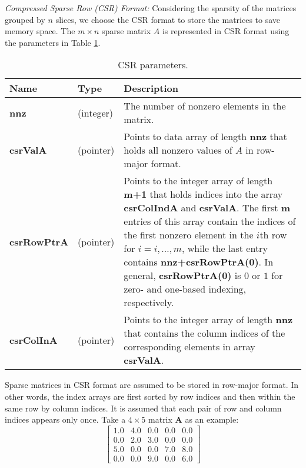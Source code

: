 \documentclass[format=acmsmall, review=false, screen=true]{acmart}
\begin{document}
\textit{Compressed Sparse Row (CSR) Format:}
Considering the sparsity of the matrices grouped by $n$ slices, we choose the CSR format
to store the matrices to save memory space. The $m \times n$ sparse matrix $A$ is represented in CSR format using the parameters in Table \ref{tbl_CSR_parameters}.
\begin{table}[t]
    \centering
    \scriptsize
    \caption{CSR parameters.}
    \label{tbl_CSR_parameters}
    \begin{tabular}{|p{3.5cm}|p{2cm}|p{5cm}|}
        \hline
        Name & Type & Description\\
        \hline
        \textbf{nnz} & (integer) & The number of nonzero elements in the
        matrix. \\
        \hline
        \textbf{csrValA} & (pointer) & Points to data array of length
        \textbf{nnz} that holds all nonzero values of $A$ in row-major
        format. \\
        \hline
        \textbf{csrRowPtrA} & (pointer) & Points to the integer array
        of length \textbf{m+1} that holds indices into the array
        \textbf{csrColIndA} and \textbf{csrValA}. The first \textbf{m}
        entries of this array contain the indices of the first nonzero
        element in the $i$th row for $i = i, \dots, m$, while the last
        entry contains \textbf{nnz+csrRowPtrA(0)}. In general,
        \textbf{csrRowPtrA(0)} is $0$ or $1$ for zero- and one-based
        indexing, respectively. \\
        \hline
        \textbf{csrColInA} & (pointer) & Points to the integer array
        of length \textbf{nnz} that contains the column indices of the
        corresponding elements in array \textbf{csrValA}. \\
        \hline
    \end{tabular}
\end{table}
Sparse matrices in CSR format are assumed to be stored in
row-major format. In other words, the index arrays are first
sorted by row indices and then within the same row by column
indices. It is assumed that each pair of row and column indices appears
only once. Take a $4 \times 5$ matrix $\mathbf{A}$ as an example:
\[
\begin{bmatrix}
    1.0 & 4.0 & 0.0 & 0.0 & 0.0 \\
    0.0 & 2.0 & 3.0 & 0.0 & 0.0 \\
    5.0 & 0.0 & 0.0 & 7.0 & 8.0 \\
    0.0 & 0.0 & 9.0 & 0.0 & 6.0
\end{bmatrix}
\]
\end{document}
